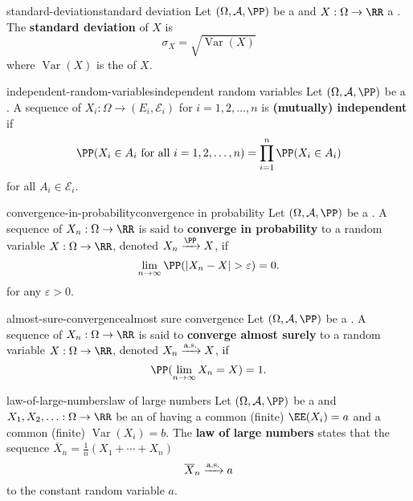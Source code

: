 \begin{topic}{standard-deviation}{standard deviation}
    Let $(\Omega, \mathcal{A}, \PP)$ be a  and $X : \Omega \to \RR$ a . The \textbf{standard deviation} of $X$ is
    \[ \sigma_X = \sqrt{\operatorname{Var}(X)} \]
    where $\operatorname{Var}(X)$ is the  of $X$.
\end{topic}

\begin{topic}{independent-random-variables}{independent random variables}
    Let $(\Omega, \mathcal{A}, \PP)$ be a . A sequence of  $X_i : \Omega \to (E_i, \mathcal{E}_i)$ for $i = 1, 2, \ldots, n$ is \textbf{(mutually) independent} if
    \[ \PP(X_i \in A_i \textup{ for all } i = 1, 2, \ldots, n) = \prod_{i = 1}^{n} \PP(X_i \in A_i) \]
    for all $A_i \in \mathcal{E}_i$.
\end{topic}

\begin{topic}{convergence-in-probability}{convergence in probability}
    Let $(\Omega, \mathcal{A}, \PP)$ be a . A sequence of  $X_n : \Omega \to \RR$ is said to \textbf{converge in probability} to a random variable $X : \Omega \to \RR$, denoted $X_n \xrightarrow{\PP} X$, if
    \[ \lim_{n \to \infty} \PP(|X_n - X| > \varepsilon) = 0 . \]
    for any $\varepsilon > 0$.
\end{topic}

\begin{topic}{almost-sure-convergence}{almost sure convergence}
    Let $(\Omega, \mathcal{A}, \PP)$ be a . A sequence of  $X_n : \Omega \to \RR$ is said to \textbf{converge almost surely} to a random variable $X : \Omega \to \RR$, denoted $X_n \xrightarrow{\textup{a.s.}} X$, if
    \[ \PP(\lim_{n \to \infty} X_n = X) = 1 . \]
\end{topic}

\begin{topic}{law-of-large-numbers}{law of large numbers}
    Let $(\Omega, \mathcal{A}, \PP)$ be a  and $X_1, X_2, \ldots : \Omega \to \RR$ be an  of  having a common (finite)  $\EE(X_i) = a$ and a common (finite)  $\operatorname{Var}(X_i) = b$. The \textbf{law of large numbers} states that the sequence $\overline{X}_n = \frac{1}{n} (X_1 + \cdots + X_n)$ 
    \[ \overline{X}_n \xrightarrow{\textup{a.s.}} a \]
    to the constant random variable $a$.
\end{topic}

